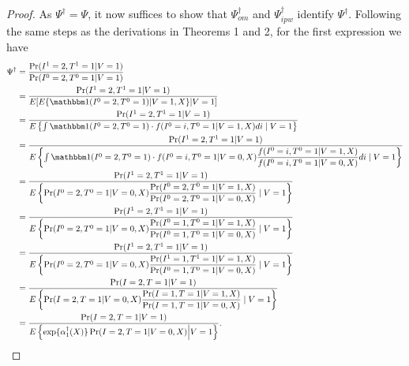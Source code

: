 \begin{appendix}
\begin{proof}
        As $\Psi^\dagger = \Psi$, it now suffices to show that $\Psi^\dagger_{om}$ and $\Psi^\dagger_{ipw}$ identify $\Psi^\dagger$. Following the same steps as the derivations in Theorems 1 and 2, for the first expression we have 
        \begin{align*}
        \Psi^\dagger &= \dfrac{\Pr(I^1=2, T^1 = 1|V=1)}{\Pr(I^0=2, T^0 = 1|V=1)} \\
        &= \dfrac{\Pr(I^1=2, T^1 = 1|V=1)}{E[E\{\mathbbm 1 (I^0 = 2, T^0 = 1) | V = 1, X\} | V = 1]} \\
        &= \dfrac{\Pr(I^1=2, T^1 = 1|V=1)}{E\left\{\int \mathbbm 1 (I^0= 2, T^0 = 1) \cdot f(I^0 = i, T^0 = 1 | V = 1, X) di \mid  V = 1\right\}} \\
        &= \dfrac{\Pr(I^1=2, T^1 = 1|V=1)}{E\left\{\int \mathbbm 1 (I^0= 2, T^0 = 1) \cdot f(I^0 = i, T^0 = 1 | V = 0, X) \dfrac{f(I^0 = i, T^0 = 1 | V = 1, X)}{f(I^0 = i, T^0 = 1 | V = 0, X)}di \mid  V = 1\right\}} \\
        &= \dfrac{\Pr(I^1=2, T^1 = 1|V=1)}{E\left\{ \Pr(I^0 = 2, T^0 = 1 | V = 0, X) \dfrac{\Pr(I^0 = 2, T^0 = 1 | V = 1, X)}{\Pr(I^0 = 2, T^0 = 1 | V = 0, X)} \mid  V = 1\right\}} \\
        &= \dfrac{\Pr(I^1=2, T^1 = 1|V=1)}{E\left\{ \Pr(I^0 = 2, T^0 = 1 | V = 0, X) \dfrac{\Pr(I^0 = 1, T^0 = 1 | V = 1, X)}{\Pr(I^0 = 1, T^0 = 1 | V = 0, X)} \mid  V = 1\right\}} \\
        &= \dfrac{\Pr(I^1=2, T^1 = 1|V=1)}{E\left\{ \Pr(I^0 = 2, T^0 = 1 | V = 0, X) \dfrac{\Pr(I^1 = 1, T^1 = 1 | V = 1, X)}{\Pr(I^0 = 1, T^0 = 1 | V = 0, X)} \mid  V = 1\right\}} \\
        &= \dfrac{\Pr(I=2, T = 1|V=1)}{E\left\{ \Pr(I = 2, T = 1 | V = 0, X) \dfrac{\Pr(I = 1, T = 1 | V = 1, X)}{\Pr(I = 1, T = 1 | V = 0, X)} \mid  V = 1\right\}} \\
        &= \dfrac{\Pr(I = 2, T = 1 | V = 1)}{E\left\{ \exp\{\alpha^\dagger_1(X)\} \Pr(I = 2, T = 1 | V = 0, X) \Big| V = 1 \right\}}.
        \end{align*}
    

\end{proof}
\end{appendix}
